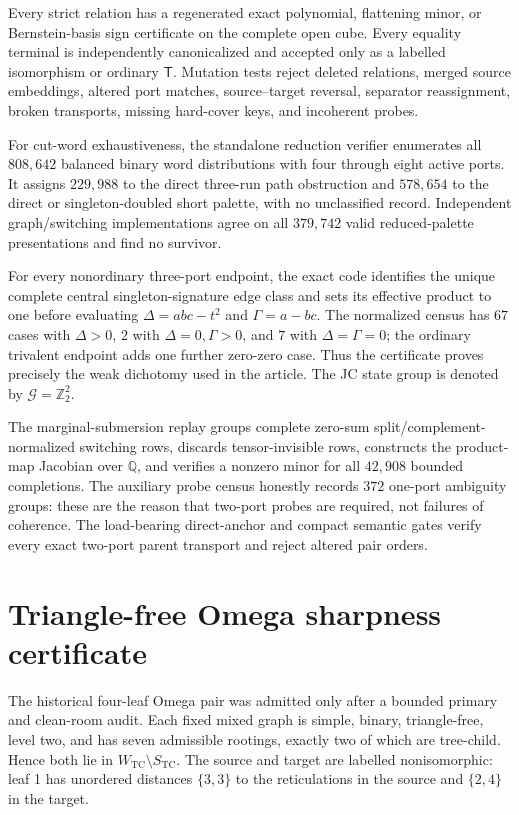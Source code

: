 \documentclass[11pt]{article}
\newcommand{\Tmove}{\mathsf T}
\begin{document}
Every strict relation has a regenerated exact polynomial, flattening minor,
or Bernstein-basis sign certificate on the complete open cube.  Every equality
terminal is independently canonicalized and accepted only as a labelled
isomorphism or ordinary $\Tmove$.  Mutation tests reject deleted relations,
merged source embeddings, altered port matches, source--target reversal,
separator reassignment, broken transports, missing hard-cover keys, and
incoherent probes.

For cut-word exhaustiveness, the standalone reduction verifier enumerates all
$808{,}642$ balanced binary word distributions with four through eight active
ports.  It assigns $229{,}988$ to the direct three-run path obstruction and
$578{,}654$ to the direct or singleton-doubled short palette, with no
unclassified record.  Independent graph/switching implementations agree on
all $379{,}742$ valid reduced-palette presentations and find no survivor.

For every nonordinary three-port endpoint, the exact code identifies the
unique complete central singleton-signature edge class and sets its effective
product to one before evaluating
$\Delta=abc-t^2$ and $\Gamma=a-bc$.  The normalized census has $67$ cases
with $\Delta>0$, $2$ with $\Delta=0,\Gamma>0$, and $7$ with
$\Delta=\Gamma=0$; the ordinary trivalent endpoint adds one further zero-zero
case.  Thus the certificate proves precisely the weak dichotomy used in the
article.  The JC state group is denoted by
$\mathcal G=\mathbb Z_2^2$.

The marginal-submersion replay groups complete zero-sum
split/complement-normalized switching rows, discards tensor-invisible rows,
constructs the product-map Jacobian over $\mathbb Q$, and verifies a nonzero
minor for all $42{,}908$ bounded completions.  The auxiliary probe census
honestly records $372$ one-port ambiguity groups: these are the reason that
two-port probes are required, not failures of coherence.  The load-bearing
direct-anchor and compact semantic gates verify every exact two-port parent
transport and reject altered pair orders.

\section{Triangle-free Omega sharpness certificate}

The historical four-leaf Omega pair was admitted only after a bounded primary
and clean-room audit.  Each fixed mixed graph is simple, binary,
triangle-free, level two, and has seven admissible rootings, exactly two of
which are tree-child.  Hence both lie in $W_{\mathrm{TC}}\setminus
S_{\mathrm{TC}}$.  The source and target are labelled nonisomorphic: leaf 1
has unordered distances $\{3,3\}$ to the reticulations in the source and
$\{2,4\}$ in the target.
\end{document}

